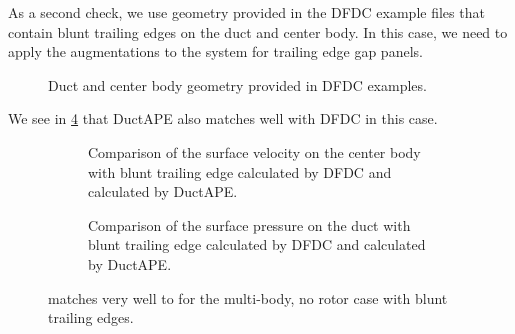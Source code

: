 As a second check, we use geometry provided in the DFDC example files that contain blunt trailing edges on the duct and center body.
%
In this case, we need to apply the augmentations to the system for trailing edge gap panels.
%
\begin{figure}[hb!]
    \centering
        
        \caption{Duct and center body geometry provided in DFDC examples.}
    \label{fig:ducthubvalgeom}
\end{figure}
%
We see in \cref{fig:dfdcexamplecomp} that DuctAPE also matches well with DFDC in this case.

\begin{figure}[htb]
     \centering
     \begin{subfigure}[b]{0.45\textwidth}
         \raggedright
         \caption{Comparison of the surface velocity on the center body with blunt trailing edge calculated by DFDC and calculated by DuctAPE.}
        \label{fig:dfdcexamplevel}
     \end{subfigure}
     \hfill
     \begin{subfigure}[b]{0.45\textwidth}
         \raggedright
         \caption{Comparison of the surface pressure on the duct with blunt trailing edge calculated by DFDC and calculated by DuctAPE.}
         \label{fig:dfdcexamplecp}
     \end{subfigure}
     \caption{ matches very well to  for the multi-body, no rotor case with blunt trailing edges.}
     \label{fig:dfdcexamplecomp}
\end{figure}
